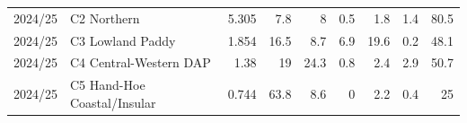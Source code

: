 \begin{tabular}{llrrrrrrr}
 2024/25 & C2 Northern                 &                 5.305 &               7.8 &                  8   &             0.5 &             1.8 &             1.4 &            80.5 \\
 2024/25 & C3 Lowland Paddy            &                 1.854 &              16.5 &                  8.7 &             6.9 &            19.6 &             0.2 &            48.1 \\
 2024/25 & C4 Central-Western DAP      &                 1.38  &              19   &                 24.3 &             0.8 &             2.4 &             2.9 &            50.7 \\
 2024/25 & C5 Hand-Hoe Coastal/Insular &                 0.744 &              63.8 &                  8.6 &             0   &             2.2 &             0.4 &            25   \\
\bottomrule
\end{tabular}